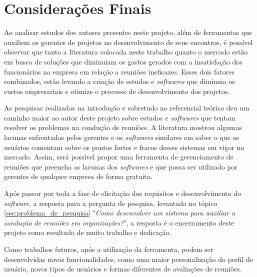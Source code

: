 \chapter{Considerações Finais}
\label{cp:consideracoes}

Ao analisar estudos dos autores presentes neste projeto, além de ferramentas que auxiliem os gerentes de projetos no desenvolvimento de seus encontros, é possível observar que tanto a literatura colocada neste trabalho quanto o mercado estão em busca de soluções que diminuiam os  gastos gerados com a insatisfação dos funcionários na empresa em relação a reuniões ineficazes. Esses dois fatores combinados, estão levando a criação de estudos e \textit{softwares} que diminuia os custos empresariais e otimize o processo de desenvolvimento dos projetos.

As pesquisas realizadas na introdução e sobretudo no referencial teórico deu um caminho maior ao autor deste projeto sobre estudos e \textit{softwares} que tentam resolver os problemas na condução de reuniões. A literatura mostrou algumas lacunas enfrentadas pelos gerentes e os \textit{softwares} similares em saber o que os usuários comentam sobre os pontos fortes e fracos desses sistemas em vigor no mercado. Assim, será possível propor uma ferramenta de gerenciamento de reuniões que preencha as lacunas dos \textit{softwares} e que possa ser utilizado por gerentes de qualquer empresa de forma gratuita.

Após passar por toda a fase de elicitação dos requisitos e desenvolvimento do \textit{software}, a resposta para a pergunta de pesquisa, levantada no tópico \ref{sec:problema_de_pesquisa} "\textit{Como desenvolver um sistema para auxiliar a condução de reuniões em organizações?}", a resposta é o encerramento deste projeto como resultado de muito trabalho e dedicação. 

Como trabalhos futuros, após a utilização da ferramenta, podem ser desenvolvidas novas funcionalidades, como uma maior personalização do perfil de usuário, novos tipos de usuários e formas diferentes de avaliações de reuniões.